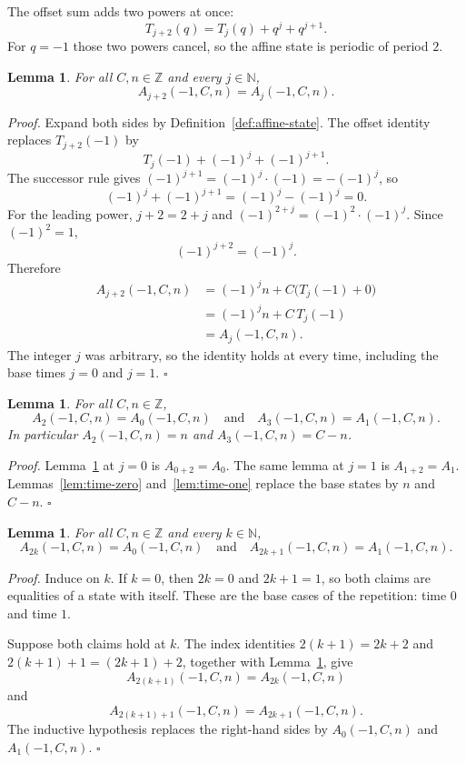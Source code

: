 \documentclass[11pt,letterpaper]{article}
\newcommand{\N}{\mathbb{N}}
\newcommand{\Z}{\mathbb{Z}}
\newtheorem{lemma}[theorem]{Lemma}
\newenvironment{proof}{\noindent\textit{Proof.}}{\hfill\(\square\)}
\begin{document}
The offset sum adds two powers at once:
\[
T_{j+2}(q)=T_j(q)+q^j+q^{j+1}.
\]
For \(q=-1\) those two powers cancel, so the affine state is periodic of
period \(2\).

\begin{lemma}
\label{lem:repeat-two}
For all \(C,n\in\Z\) and every \(j\in\N\),
\[
A_{j+2}(-1,C,n)=A_j(-1,C,n).
\]
\end{lemma}

\begin{proof}
Expand both sides by Definition~\ref{def:affine-state}. The offset identity
replaces \(T_{j+2}(-1)\) by
\[
T_j(-1)+(-1)^j+(-1)^{j+1}.
\]
The successor rule gives \((-1)^{j+1}=(-1)^j\cdot(-1)=-(-1)^j\), so
\[
(-1)^j+(-1)^{j+1}=(-1)^j-(-1)^j=0.
\]
For the leading power, \(j+2=2+j\) and
\((-1)^{2+j}=(-1)^2\cdot(-1)^j\). Since \((-1)^2=1\),
\[
(-1)^{j+2}=(-1)^j.
\]
Therefore
\begin{align*}
A_{j+2}(-1,C,n)
&=(-1)^j n+C\bigl(T_j(-1)+0\bigr)\\
&=(-1)^j n+C\,T_j(-1)\\
&=A_j(-1,C,n).
\end{align*}
The integer \(j\) was arbitrary, so the identity holds at every time,
including the base times \(j=0\) and \(j=1\).
\end{proof}

\begin{lemma}
\label{lem:repeat-bases}
For all \(C,n\in\Z\),
\[
A_{2}(-1,C,n)=A_0(-1,C,n)
\quad\text{and}\quad
A_{3}(-1,C,n)=A_1(-1,C,n).
\]
In particular \(A_2(-1,C,n)=n\) and \(A_3(-1,C,n)=C-n\).
\end{lemma}

\begin{proof}
Lemma~\ref{lem:repeat-two} at \(j=0\) is \(A_{0+2}=A_0\). The same lemma at
\(j=1\) is \(A_{1+2}=A_1\). Lemmas~\ref{lem:time-zero} and~\ref{lem:time-one}
replace the base states by \(n\) and \(C-n\).
\end{proof}

\begin{lemma}
\label{lem:from-bases}
For all \(C,n\in\Z\) and every \(k\in\N\),
\[
A_{2k}(-1,C,n)=A_0(-1,C,n)
\quad\text{and}\quad
A_{2k+1}(-1,C,n)=A_1(-1,C,n).
\]
\end{lemma}

\begin{proof}
Induce on \(k\). If \(k=0\), then \(2k=0\) and \(2k+1=1\), so both claims
are equalities of a state with itself. These are the base cases of the
repetition: time \(0\) and time \(1\).

Suppose both claims hold at \(k\). The index identities
\(2(k+1)=2k+2\) and \(2(k+1)+1=(2k+1)+2\), together with
Lemma~\ref{lem:repeat-two}, give
\[
A_{2(k+1)}(-1,C,n)=A_{2k}(-1,C,n)
\]
and
\[
A_{2(k+1)+1}(-1,C,n)=A_{2k+1}(-1,C,n).
\]
The inductive hypothesis replaces the right-hand sides by \(A_0(-1,C,n)\)
and \(A_1(-1,C,n)\).
\end{proof}
\end{document}
